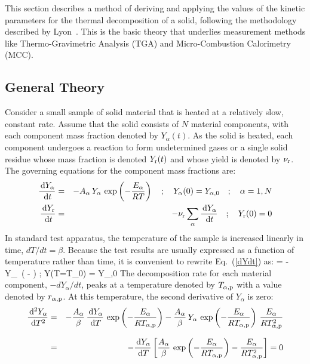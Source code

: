 \documentclass[11pt]{book}
\begin{document}
This section describes a method of deriving and applying the values of the kinetic parameters for the thermal decomposition of a solid, following the methodology described by Lyon~\cite{Lyon:FM2000}. This is the basic theory that underlies measurement methods like Thermo-Gravimetric Analysis (TGA) and Micro-Combustion Calorimetry (MCC).


\subsection{General Theory}

Consider a small sample of solid material that is heated at a relatively slow, constant rate. Assume that the solid consists of $N$ material components, with each component mass fraction denoted by $Y_\alpha(t)$. As the solid is heated, each component undergoes a reaction to form undetermined gases or a single solid residue whose mass fraction is denoted $Y_{\rm r}(t)$ and whose yield is denoted by $\nu_{\rm r}$. The governing equations for the component mass fractions are:
\begin{eqnarray}
   \frac{\,\mathrm{d} Y_\alpha}{\,\mathrm{d} t} &=& -A_\alpha \, Y_\alpha \, \exp \left( -\frac{E_\alpha}{RT} \right)    \quad ; \quad Y_\alpha(0) = Y_{\alpha,0} \quad ; \quad \alpha=1,N  \label{dYdt} \\
   \frac{\,\mathrm{d} Y_{\rm r}}{\,\mathrm{d} t} &=& -\nu_{\rm r}  \sum_\alpha \frac{\,\mathrm{d} Y_\alpha}{\,\mathrm{d} t}                                   \quad ; \quad Y_{\rm r}(0) = 0  \label{dYrdt}
\end{eqnarray}
In standard test apparatus, the temperature of the sample is increased linearly in time, $dT/dt=\beta$. Because the test results are usually expressed as a function of temperature rather than time, it is convenient to rewrite Eq.~(\ref{dYdt}) as:
\be
    = - \, Y_\alpha \, \exp \left( - \right)    \quad ; \quad Y(T=T_0) = Y_{\alpha,0}  \label{dYdT}
\ee
The decomposition rate for each material component, $-dY_\alpha/dt$, peaks at a temperature denoted by $T_{\alpha,{\rm p}}$ with a value denoted by $r_{\alpha,{\rm p}}$. At this temperature, the second derivative of $Y_\alpha$ is zero:
\begin{eqnarray}
   \frac{\,\mathrm{d}^2 Y_\alpha}{\,\mathrm{d} T^2} &=& -\frac{A_\alpha}{\beta} \, \frac{\,\mathrm{d} Y_\alpha}{\,\mathrm{d} T} \, \exp \left( -\frac{E_\alpha}{R T_{\alpha,{\rm p}} } \right) -
   \frac{A_\alpha}{\beta} \, Y_\alpha \, \exp \left( -\frac{E_\alpha}{R T_{\alpha,{\rm p}} } \right) \, \frac{E_\alpha}{R T_{\alpha,{\rm p}}^2} \nonumber \\[.1in]
   &=& -\frac{\,\mathrm{d} Y_\alpha}{\,\mathrm{d} T} \left[ \frac{A_\alpha}{\beta} \, \exp \left( -\frac{E_\alpha}{R T_{\alpha,{\rm p}} } \right) - \frac{E_\alpha}{R T_{\alpha,{\rm p}}^2} \right] = 0  \label{d2YdT2}
\end{eqnarray}
\end{document}
